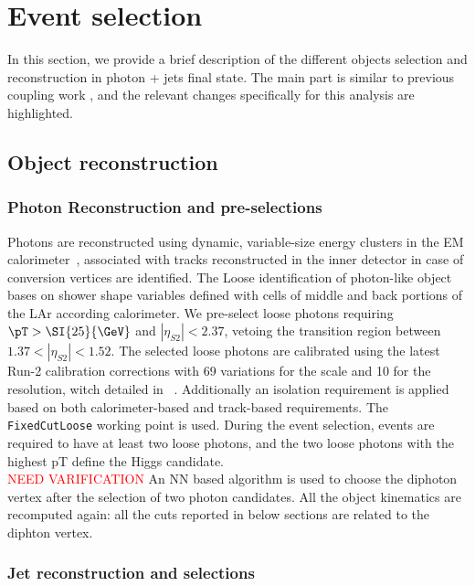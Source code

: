 \section{Event selection}
\label{sec:hgam_selection}


In this section, we provide a brief description of the different objects selection and reconstruction in photon + jets final state. The main part is similar to previous \Hyy coupling work \cite{ATLAS-CONF-2020-026}, and the relevant changes specifically for this analysis are highlighted. 

\subsection{Object reconstruction}
\label{ssec:obj_reconstruction}

\subsubsection{Photon Reconstruction and pre-selections}
Photons are reconstructed using dynamic, variable-size energy clusters in the EM calorimeter~\cite{ATL-PHYS-PUB-2017-022}, associated with tracks reconstructed in the inner detector in case of conversion vertices are identified. The Loose identification of photon-like object bases on shower shape variables defined with cells of middle and back portions of the LAr according calorimeter. We pre-select loose photons requiring $\pT>\SI{25}{\GeV}$ and $|\eta_{S2}|<2.37$, vetoing the transition region between $1.37 < |\eta_{S2}| < 1.52$. The selected loose photons are calibrated using the latest Run-2 calibration corrections with 69 variations for the scale and 10 for the resolution, witch detailed in ~\cite{Andari:2655306}. Additionally an isolation requirement is applied based on both calorimeter-based and track-based requirements. The \texttt{FixedCutLoose} working point is used. During the event selection, events are required to have at least two loose photons, and the two loose photons with the highest pT define the Higgs candidate.\\

\textcolor{red}{NEED VARIFICATION} An NN based algorithm is used to choose the diphoton vertex after the selection of two photon candidates. All the object kinematics are recomputed again: all the cuts reported in below sections are related to the diphton vertex.


\subsubsection{Jet reconstruction and selections}

